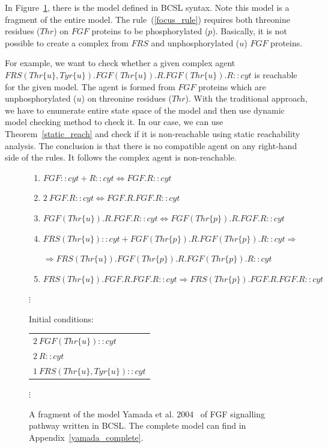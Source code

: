 \documentclass[12pt, twoside]{fithesis2} %
\begin{document}
In Figure~\ref{fgf_fragment}, there is the model defined in BCSL syntax. Note this model is a fragment of the entire model. The rule~(\ref{focus_rule}) requires both threonine residues ($Thr$) on $FGF$ proteins to be phosphorylated ($p$). Basically, it is not possible to create a complex from $FRS$ and unphosphorylated ($u$) $FGF$ proteins.

For example, we want to check whether a given complex agent {\small $FRS(Thr\{u\}, Tyr\{u\}).FGF(Thr\{u\}).R.FGF(Thr\{u\}).R::cyt$} is reachable for the given model. The agent is formed from $FGF$ proteins which are unphosphorylated ($u$) on threonine residues ($Thr$). With the traditional approach, we have to enumerate entire state space of the model and then use dynamic model checking method to check it. In our case, we can use Theorem~\ref{static_reach} and check if it is non-reachable using static reachability analysis. The conclusion is that there is no compatible agent on any right-hand side of the rules. It follows the complex agent is non-reachable.

\begin{figure}[!h]
{\footnotesize
\begin{center}
\begin{enumerate}
\item $FGF::cyt + R::cyt \Leftrightarrow FGF.R::cyt$ 
\item $2~ FGF.R::cyt \Leftrightarrow FGF.R.FGF.R::cyt$
\item $FGF(Thr\{u\}).R.FGF.R::cyt \Leftrightarrow FGF(Thr\{p\}).R.FGF.R::cyt$ 
\item \label{focus_rule} $FRS(Thr\{u\})::cyt + FGF(Thr\{p\}).R.FGF(Thr\{p\}).R::cyt \Rightarrow$ 

$\Rightarrow FRS(Thr\{u\}).FGF(Thr\{p\}).R.FGF(Thr\{p\}).R::cyt$ 

\item $FRS(Thr\{u\}).FGF.R.FGF.R::cyt \Rightarrow FRS(Thr\{p\}).FGF.R.FGF.R::cyt$ 

\end{enumerate}

$\vdots$

\vspace*{0.5cm}
Initial conditions:
\begin{tabular}{l}
$2~ FGF(Thr\{u\})::cyt$\\
$2~ R::cyt$\\
$1~ FRS(Thr\{u\}, Tyr\{u\})::cyt$\\
\end{tabular}

$\vdots$

\end{center}

}
\caption{A fragment of the model Yamada et al. 2004~\cite{yamada2004model} of FGF signalling pathway written in BCSL. The complete model can find in Appendix~\ref{yamada_complete}.}\label{fgf_fragment}
\end{figure}
\end{document}
